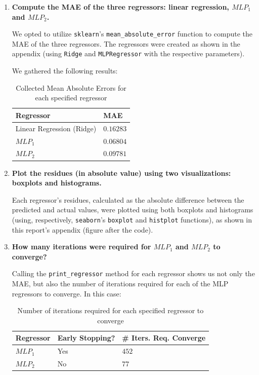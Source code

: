 \documentclass[12pt]{article}
\begin{document}
\begin{enumerate}[leftmargin=\labelsep,resume]
  \item \textbf{Compute the MAE of the three regressors: linear regression, $MLP_1$ and $MLP_2$.}

        We opted to utilize \texttt{sklearn}'s \texttt{mean\_absolute\_error} function to compute the MAE of the three regressors.
        The regressors were created as shown in the appendix (using \texttt{Ridge} and
        \texttt{MLPRegressor} with the respective parameters).

        We gathered the following results:

        \begin{table}[H]
          \centering
          \begin{tabular}{l|l}
            \textbf{Regressor}        & \textbf{MAE} \\ \hline
            Linear Regression (Ridge) & $0.16283$    \\
            $MLP_1$                   & $0.06804$    \\
            $MLP_2$                   & $0.09781$
          \end{tabular}
          \caption{Collected Mean Absolute Errors for each specified regressor}
          \label{tab:mean-absolute-errors}
        \end{table}

  \item \textbf{Plot the residues (in absolute value) using two visualizations: boxplots and histograms.}

        Each regressor's residues, calculated as the absolute difference between
        the predicted and actual values, were plotted using both boxplots and histograms
        (using, respectively, \texttt{seaborn}'s \texttt{boxplot} and \texttt{histplot} functions),
        as shown in this report's appendix (figure after the code).

  \item \textbf{How many iterations were required for $MLP_1$ and $MLP_2$ to converge?}

        Calling the \texttt{print\_regressor} method for each regressor shows us
        not only the MAE, but also the number of iterations required for each of
        the MLP regressors to converge. In this case:

        \begin{table}[H]
          \centering
          \begin{tabular}{l|l|l}
            \textbf{Regressor} & \textbf{Early Stopping?} & \textbf{\# Iters. Req. Converge} \\ \hline
            $MLP_1$            & Yes                      & $452$                            \\
            $MLP_2$            & No                       & $77$
          \end{tabular}
          \caption{Number of iterations required for each specified regressor to converge}
          \label{tab:mean-absolute-errors}
        \end{table}


\end{enumerate}
\end{document}
